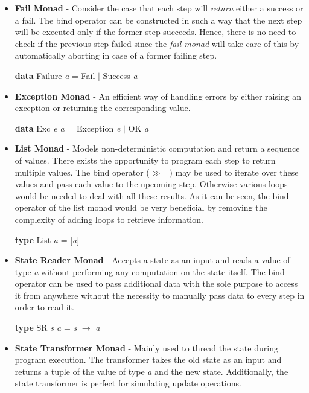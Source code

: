 \documentclass[a4paper, onecolumn]{article}
\begin{document}
    \begin{itemize}
        \item \textbf{Fail Monad} - Consider the case that each step will \textit{return} either a success or a fail. The bind operator can be constructed in such a way that the next step will be executed only if the former step succeeds. Hence, there is no need to check if the previous step failed since the \textit{fail monad} will take care of this by automatically aborting in case of a former failing step.
        \begin{center}
            \textbf{data} Failure \textit{a} = Fail $\vert$ Success \textit{a} 
        \end{center}
        \item \textbf{Exception Monad} - An efficient way of handling errors by either raising an exception or returning the corresponding value. 
        \begin{center}
            \textbf{data} Exc \textit{e a} = Exception \textit{e} $\vert$ OK \textit{a}
        \end{center}
        \item \textbf{List Monad} - Models non-deterministic computation and return a sequence of values. There exists the opportunity to program each step to return multiple values. The bind operator ($\gg$=) may be used to iterate over these values and pass each value to the upcoming step. Otherwise various loops would be needed to deal with all these results. As it can be seen, the bind operator of the list monad would be very beneficial by removing the complexity of adding loops to retrieve information. 
        \begin{center}
            \textbf{type} List \textit{a} = [\textit{a}]
        \end{center}
        \item \textbf{State Reader Monad} - Accepts a state as an input and reads a value of type \textit{a} without performing any computation on the state itself. The bind operator can be used to pass additional data with the sole purpose to access it from anywhere without the necessity to manually pass data to every step in order to read it. 
        \begin{center}
            \textbf{type} SR \textit{s a} = \textit{s} $\rightarrow$ \textit{a}
        \end{center}
        \item \textbf{State Transformer Monad} - Mainly used to thread the state during program execution. The transformer takes the old state as an input and returns a tuple of the value of type \textit{a} and the new state. Additionally, the state transformer is perfect for simulating update operations.

\end{itemize}
\end{document}
